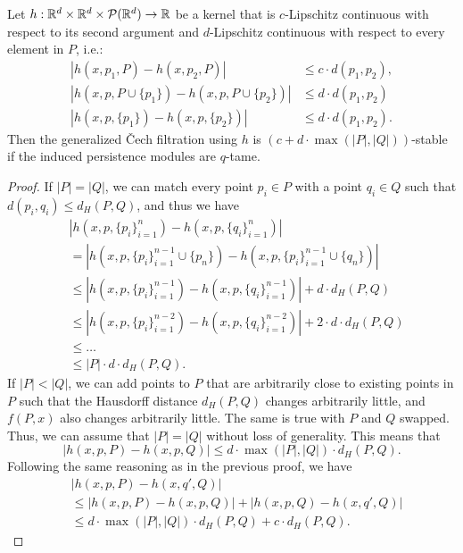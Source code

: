 \begin{theorem}
    Let $h : \mathbb{R}^d \times \mathbb{R}^d \times \mathcal{P}(\mathbb{R}^d) \to \mathbb{R}$ be a kernel that
    is $c$-Lipschitz continuous with respect to its second argument and
    $d$-Lipschitz continuous with respect to every element in $P$, i.e.:
    \begin{align}
        |h(x, p_1, P) - h(x, p_2, P)| & \leq c \cdot d(p_1, p_2), \\
        |h(x, p, P \cup \{p_1\}) - h(x, p, P \cup \{p_2\})| & \leq d \cdot d(p_1, p_2) \\
        |h(x, p, \{p_1\}) - h(x, p, \{p_2\})| & \leq d \cdot d(p_1, p_2). 
    \end{align}
    Then the
    generalized \v{C}ech filtration using $h$ is
    $(c + d \cdot \max(|P|, |Q|))$-stable if the induced persistence modules are
    $q$-tame.
\end{theorem}
\begin{proof}
    If $|P| = |Q|$, we can match every point $p_i \in P$ with a point
    $q_i \in Q$ such that $d(p_i, q_i) \leq d_H(P, Q)$, and thus we have
    \begin{align}
        & |h(x, p, \{p_i\}_{i = 1}^n) - h(x, p, \{q_i\}_{i = 1}^n)| \\
        & = |h(x, p, \{p_i\}_{i = 1}^{n-1} \cup \{p_n\}) - h(x, p, \{p_i\}_{i = 1}^{n-1} \cup \{q_n\})| \\
        & \leq |h(x, p, \{p_i\}_{i = 1}^{n-1}) - h(x, p, \{q_i\}_{i = 1}^{n-1})| + d \cdot d_H(P, Q) \\
        & \leq |h(x, p, \{p_i\}_{i = 1}^{n-2}) - h(x, p, \{q_i\}_{i = 1}^{n-2})| + 2 \cdot d \cdot d_H(P, Q) \\
        & \leq \ldots \\
        & \leq |P| \cdot d \cdot d_H(P, Q).
    \end{align}
    If $|P| < |Q|$, we can add points to $P$ that are arbitrarily close to
    existing points in $P$ such that the Hausdorff distance
    $d_H(P, Q)$ changes arbitrarily little, and $f(P, x)$ also changes
    arbitrarily little. The same is true with $P$ and $Q$ swapped. Thus, we can
    assume that $|P| = |Q|$ without loss of generality. This means that
    \begin{equation}
        |h(x, p, P) - h(x, p, Q)| \leq d \cdot \max(|P|, |Q|) \cdot d_H(P, Q).
    \end{equation}
    Following the same reasoning as in the previous proof, we have
    \begin{align}
        & |h(x, p, P) - h(x, q', Q)| \\
        & \leq |h(x, p, P) - h(x, p, Q)| + |h(x, p, Q) - h(x, q', Q)| \\
        & \leq d \cdot \max(|P|, |Q|) \cdot d_H(P, Q) + c \cdot d_H(P, Q).
    \end{align}
\end{proof}

